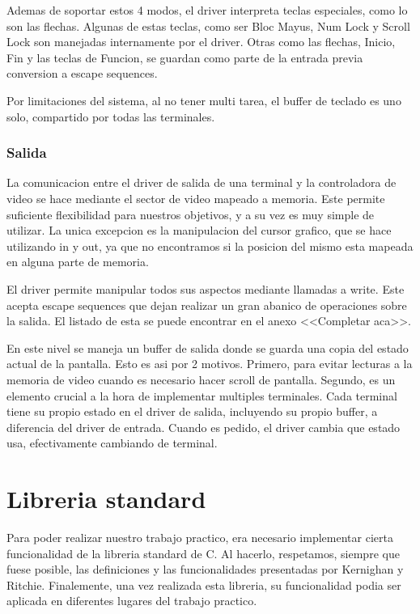 \documentclass[a4paper,10pt]{article}
\begin{document}
            Ademas de soportar estos 4 modos, el driver interpreta teclas especiales, como lo son las flechas.
            Algunas de estas teclas, como ser Bloc Mayus, Num Lock y Scroll Lock son manejadas internamente por el driver.
            Otras como las flechas, Inicio, Fin y las teclas de Funcion, se guardan como parte de la entrada previa conversion a escape sequences.

            Por limitaciones del sistema, al no tener multi tarea, el buffer de teclado es uno solo, compartido por todas las terminales.

        \subsubsection{Salida}
            La comunicacion entre el driver de salida de una terminal y la controladora de video se hace mediante el sector de video mapeado a memoria.
            Este permite suficiente flexibilidad para nuestros objetivos, y a su vez es muy simple de utilizar.
            La unica excepcion es la manipulacion del cursor grafico, que se hace utilizando in y out, ya que no encontramos si la posicion del mismo esta mapeada en alguna parte de memoria.

            El driver permite manipular todos sus aspectos mediante llamadas a write.
            Este acepta escape sequences que dejan realizar un gran abanico de operaciones sobre la salida.
            El listado de esta se puede encontrar en el anexo <<Completar aca>>.
            
            En este nivel se maneja un buffer de salida donde se guarda una copia del estado actual de la pantalla.
            Esto es asi por 2 motivos.
            Primero, para evitar lecturas a la memoria de video cuando es necesario hacer scroll de pantalla.
            Segundo, es un elemento crucial a la hora de implementar multiples terminales.
            Cada terminal tiene su propio estado en el driver de salida, incluyendo su propio buffer, a diferencia del driver de entrada.
            Cuando es pedido, el driver cambia que estado usa, efectivamente cambiando de terminal.

\section{Libreria standard}
    Para poder realizar nuestro trabajo practico, era necesario implementar cierta funcionalidad de la libreria standard de C. Al hacerlo, respetamos, siempre que fuese posible, las definiciones y las funcionalidades presentadas por Kernighan y Ritchie.
    Finalemente, una vez realizada esta libreria, su funcionalidad podia ser aplicada en diferentes lugares del trabajo practico.
\end{document}
